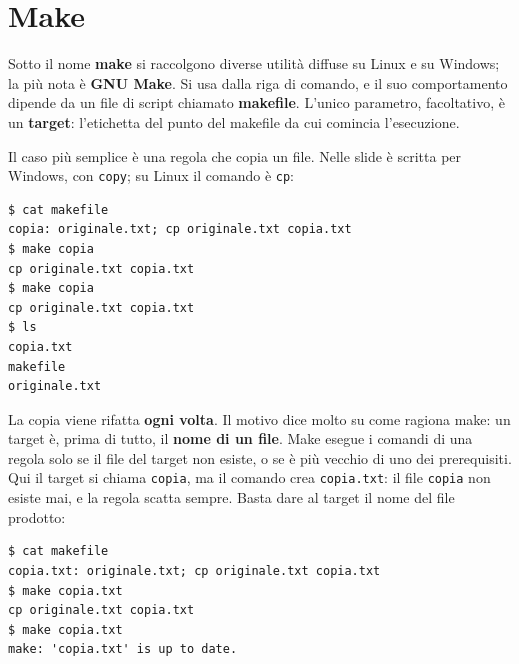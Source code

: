 \section{Make}

Sotto il nome \textbf{make} si raccolgono diverse utilità diffuse su Linux e su Windows; la più nota è \textbf{GNU Make}.
Si usa dalla riga di comando, e il suo comportamento dipende da un file di script chiamato \textbf{makefile}. L'unico
parametro, facoltativo, è un \textbf{target}: l'etichetta del punto del makefile da cui comincia l'esecuzione.


Il caso più semplice è una regola che copia un file. Nelle slide è scritta per Windows, con \texttt{copy}; su Linux il
comando è \texttt{cp}:

\begin{lstlisting}[style=shell, name=Terminale]
$ cat makefile
copia: originale.txt; cp originale.txt copia.txt
$ make copia
cp originale.txt copia.txt
$ make copia
cp originale.txt copia.txt
$ ls
copia.txt
makefile
originale.txt
\end{lstlisting}

La copia viene rifatta \textbf{ogni volta}. Il motivo dice molto su come ragiona make: un target è, prima di tutto, il
\textbf{nome di un file}. Make esegue i comandi di una regola solo se il file del target non esiste, o se è più vecchio
di uno dei prerequisiti. Qui il target si chiama \texttt{copia}, ma il comando crea \texttt{copia.txt}: il file
\texttt{copia} non esiste mai, e la regola scatta sempre. Basta dare al target il nome del file prodotto:

\begin{lstlisting}[style=shell, name=Terminale]
$ cat makefile
copia.txt: originale.txt; cp originale.txt copia.txt
$ make copia.txt
cp originale.txt copia.txt
$ make copia.txt
make: 'copia.txt' is up to date.
\end{lstlisting}


